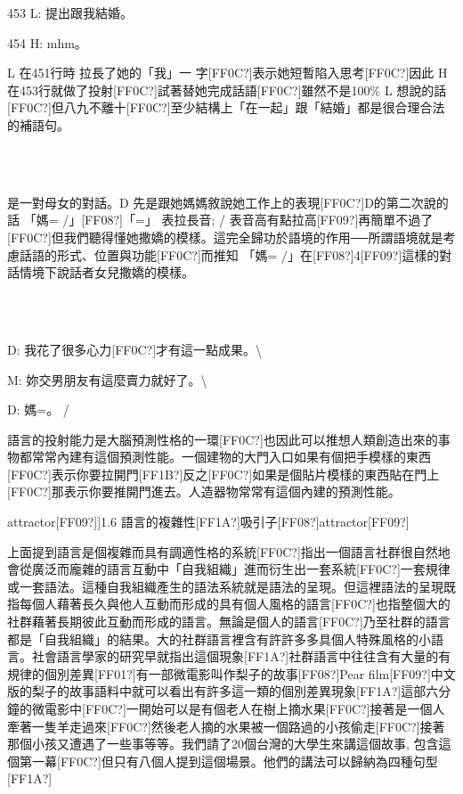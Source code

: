453  L:  提出跟我結婚。

454  H:  mhm。

\begin{styletext}
L 在451行時 拉長了她的「我」一 字[FF0C?]表示她短暫陷入思考[FF0C?]因此 H在453行就做了投射[FF0C?]試著替她完成話語[FF0C?]雖然不是100\%  L 想說的話[FF0C?]但八九不離十[FF0C?]至少結構上「在一起」跟「結婚」都是很合理合法的補語句。
\end{styletext}

\ea%
\label{ex:key:4}
\gll\\
\\
\glt
\z

是一對母女的對話。D 先是跟她媽媽敘說她工作上的表現[FF0C?]D的第二次說的話 「媽= /」[FF08?]「=」 表拉長音; / 表音高有點拉高[FF09?]再簡單不過了[FF0C?]但我們聽得懂她撒嬌的模樣。這完全歸功於語境的作用──所謂語境就是考慮話語的形式、位置與功能[FF0C?]而推知 「媽= /」在[FF08?]4[FF09?]這樣的對話情境下說話者女兒撒嬌的模樣。

\ea%
\label{ex:key:4}
\gll\\
\\
\glt
\z

D:  我花了很多心力[FF0C?]才有這一點成果。{\textbackslash}

M:  妳交男朋友有這麼賣力就好了。{\textbackslash}

D:  媽=。 /

語言的投射能力是大腦預測性格的一環[FF0C?]也因此可以推想人類創造出來的事物都常常內建有這個預測性能。一個建物的大門入口如果有個把手模樣的東西[FF0C?]表示你要拉開門[FF1B?]反之[FF0C?]如果是個貼片模樣的東西貼在門上[FF0C?]那表示你要推開門進去。人造器物常常有這個內建的預測性能。

attractor[FF09?]]{1.6 語言的複雜性[FF1A?]吸引子[FF08?]attractor[FF09?]}

上面提到語言是個複雜而具有調適性格的系統[FF0C?]指出一個語言社群很自然地會從廣泛而龐雜的語言互動中「自我組織」進而衍生出一套系統[FF0C?]一套規律或一套語法。這種自我組織產生的語法系統就是語法的呈現。但這裡語法的呈現既指每個人藉著長久與他人互動而形成的具有個人風格的語言[FF0C?]也指整個大的社群藉著長期彼此互動而形成的語言。無論是個人的語言[FF0C?]乃至社群的語言都是「自我組織」的結果。大的社群語言裡含有許許多多具個人特殊風格的小語言。社會語言學家的研究早就指出這個現象[FF1A?]社群語言中往往含有大量的有規律的個別差異[FF01?]有一部微電影叫作梨子的故事[FF08?]Pear film[FF09?]中文版的梨子的故事語料中就可以看出有許多這一類的個別差異現象[FF1A?]這部六分鐘的微電影中[FF0C?]一開始可以是有個老人在樹上摘水果[FF0C?]接著是一個人牽著一隻羊走過來[FF0C?]然後老人摘的水果被一個路過的小孩偷走[FF0C?]接著那個小孩又遭遇了一些事等等。我們請了20個台灣的大學生來講這個故事, 包含這個第一幕[FF0C?]但只有八個人提到這個場景。他們的講法可以歸納為四種句型[FF1A?]

